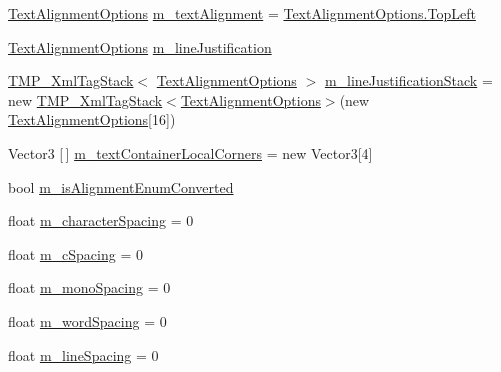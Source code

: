 \begin{DoxyCompactItemize}
\item 
\mbox{\hyperlink{namespace_t_m_pro_a1dd743b58b1fd4057c00e4b98ab86301}{Text\+Alignment\+Options}} \mbox{\hyperlink{class_t_m_pro_1_1_t_m_p___text_a5c665e9bf0381a661e3f16dd64d026f5}{m\+\_\+text\+Alignment}} = \mbox{\hyperlink{namespace_t_m_pro_a1dd743b58b1fd4057c00e4b98ab86301ab32beb056fbfe36afbabc6c88c81ab36}{Text\+Alignment\+Options.\+Top\+Left}}
\item 
\mbox{\hyperlink{namespace_t_m_pro_a1dd743b58b1fd4057c00e4b98ab86301}{Text\+Alignment\+Options}} \mbox{\hyperlink{class_t_m_pro_1_1_t_m_p___text_af457c6c84c55f47a3b2b3db469921830}{m\+\_\+line\+Justification}}
\item 
\mbox{\hyperlink{struct_t_m_pro_1_1_t_m_p___xml_tag_stack}{T\+M\+P\+\_\+\+Xml\+Tag\+Stack}}$<$ \mbox{\hyperlink{namespace_t_m_pro_a1dd743b58b1fd4057c00e4b98ab86301}{Text\+Alignment\+Options}} $>$ \mbox{\hyperlink{class_t_m_pro_1_1_t_m_p___text_acd021703ea5ea92b47512c2bfa86dec4}{m\+\_\+line\+Justification\+Stack}} = new \mbox{\hyperlink{struct_t_m_pro_1_1_t_m_p___xml_tag_stack}{T\+M\+P\+\_\+\+Xml\+Tag\+Stack}}$<$\mbox{\hyperlink{namespace_t_m_pro_a1dd743b58b1fd4057c00e4b98ab86301}{Text\+Alignment\+Options}}$>$(new \mbox{\hyperlink{namespace_t_m_pro_a1dd743b58b1fd4057c00e4b98ab86301}{Text\+Alignment\+Options}}\mbox{[}16\mbox{]})
\item 
Vector3 \mbox{[}$\,$\mbox{]} \mbox{\hyperlink{class_t_m_pro_1_1_t_m_p___text_a1ca1826bbe128f640c6a19a63d61f03d}{m\+\_\+text\+Container\+Local\+Corners}} = new Vector3\mbox{[}4\mbox{]}
\item 
bool \mbox{\hyperlink{class_t_m_pro_1_1_t_m_p___text_a598001f8b78f6cb072cfffa54d53bbd7}{m\+\_\+is\+Alignment\+Enum\+Converted}}
\item 
float \mbox{\hyperlink{class_t_m_pro_1_1_t_m_p___text_a565642545a62d27a3f8a694dad78a102}{m\+\_\+character\+Spacing}} = 0
\item 
float \mbox{\hyperlink{class_t_m_pro_1_1_t_m_p___text_a8c6aa2c0d128cd8b4e296cda70d65aca}{m\+\_\+c\+Spacing}} = 0
\item 
float \mbox{\hyperlink{class_t_m_pro_1_1_t_m_p___text_a682f9aef3250dd27e918e9fa7cc265d2}{m\+\_\+mono\+Spacing}} = 0
\item 
float \mbox{\hyperlink{class_t_m_pro_1_1_t_m_p___text_a8da34d05807d0893ccc416ee408175cd}{m\+\_\+word\+Spacing}} = 0
\item 
float \mbox{\hyperlink{class_t_m_pro_1_1_t_m_p___text_ae1feb5cf8ce01025a827aa0fc820aa91}{m\+\_\+line\+Spacing}} = 0
\item 

\end{DoxyCompactItemize}
